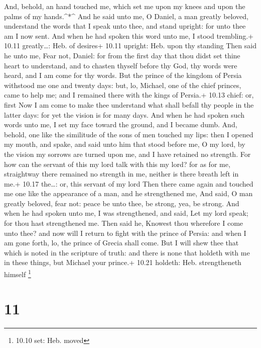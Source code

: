  And, behold, an hand touched me, which set me upon my
knees and upon the palms of my hands.\^{}*\^{}  And he said
unto me, O Daniel, a man greatly beloved, understand the words that I
speak unto thee, and stand upright: for unto thee am I now sent. And
when he had spoken this word unto me, I stood trembling.+ 10.11
greatly\ldots: Heb. of desires+ 10.11 upright: Heb. upon thy standing
 Then said he unto me, Fear not, Daniel: for from the first
day that thou didst set thine heart to understand, and to chasten
thyself before thy God, thy words were heard, and I am come for thy
words.  But the prince of the kingdom of Persia withstood
me one and twenty days: but, lo, Michael, one of the chief princes, came
to help me; and I remained there with the kings of Persia.+ 10.13 chief:
or, first  Now I am come to make thee understand what shall
befall thy people in the latter days: for yet the vision is for many
days.  And when he had spoken such words unto me, I set my
face toward the ground, and I became dumb.  And, behold,
one like the similitude of the sons of men touched my lips: then I
opened my mouth, and spake, and said unto him that stood before me, O my
lord, by the vision my sorrows are turned upon me, and I have retained
no strength.  For how can the servant of this my lord talk
with this my lord? for as for me, straightway there remained no strength
in me, neither is there breath left in me.+ 10.17 the\ldots: or, this
servant of my lord  Then there came again and touched me
one like the appearance of a man, and he strengthened me, 
And said, O man greatly beloved, fear not: peace be unto thee, be
strong, yea, be strong. And when he had spoken unto me, I was
strengthened, and said, Let my lord speak; for thou hast strengthened
me.  Then said he, Knowest thou wherefore I come unto thee?
and now will I return to fight with the prince of Persia: and when I am
gone forth, lo, the prince of Grecia shall come.  But I
will shew thee that which is noted in the scripture of truth: and there
is none that holdeth with me in these things, but Michael your prince.+
10.21 holdeth: Heb. strengtheneth himself \footnote{10.10 set: Heb.
  moved}

\hypertarget{section-10}{%
\section{11}\label{section-10}}

